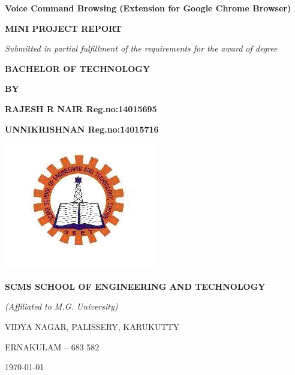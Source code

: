 \documentclass[11pt]{report} %
\begin{document}
	
	\thispagestyle{empty}
	\begin{center}
		\begin{minipage}{\linewidth}
			\centering
			\vspace{2cm}
			{\Huge \bf{Voice Command Browsing (Extension for Google Chrome  Browser)}\par}
			\vspace{1cm}
			{\Large \bfseries{MINI PROJECT REPORT}\par}
			\vspace{0.5cm}
			{\Large \emph{Submitted in partial fulfillment of the requirements for the award of degree}\par}
			\vspace{0.5cm}
			{\Large \bf{BACHELOR OF TECHNOLOGY} \par}
			\vspace{0.5cm}
			{\Large \bf{BY} \par}
			\vspace{1cm}
			{\Large \bf{RAJESH R NAIR}\hspace{3cm}     Reg.no:14015695 \par}
			{\Large \bf{UNNIKRISHNAN}\hspace{3cm}      Reg.no:14015716 \par}
			\vspace{1cm}
			\includegraphics[width=0.5\linewidth]{figures/logo.png}
			
			{\Large \bfseries{SCMS SCHOOL OF ENGINEERING AND TECHNOLOGY}\par}
			{\Large \emph{(Affiliated to M.G. University)}\par}
			{\Large VIDYA NAGAR, PALISSERY, KARUKUTTY\par}
			{\Large ERNAKULAM – 683 582\par}
			\vspace{1cm}
			
			
			{\Large \monthyeardate \today}
		\end{minipage}
	\end{center}
	\clearpage
	
\end{document}

